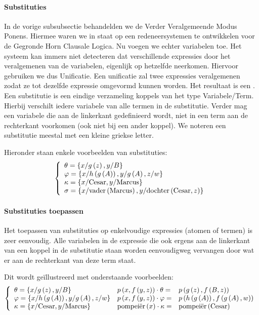 \paragraph{Substituties}
In de vorige subsubsectie behandelden we de Verder Veralgemeende Modus Ponens. Hiermee waren we in staat op een redeneersystemen te ontwikkelen voor de Gegronde Horn Clausale Logica. Nu voegen we echter variabelen toe. Het systeem kan immers niet detecteren dat verschillende expressies door het veralgemenen van de variabelen, eigenlijk op hetzelfde neerkomen. Hiervoor gebruiken we dus Unificatie. Een unificatie zal twee expressies veralgemenen zodat ze tot dezelfde expressie omgevormd kunnen worden. Het resultaat is een . Een substitutie is een eindige verzameling koppels van het type Variabele/Term. Hierbij verschilt iedere variabele van alle termen in de substitutie. Verder mag een variabele die aan de linkerkant gedefinieerd wordt, niet in een term aan de rechterkant voorkomen (ook niet bij een ander koppel). We noteren een substitutie meestal met een kleine griekse letter.
\begin{leftbar}
Hieronder staan enkele voorbeelden van substituties:
\begin{equation}
\left\{\begin{array}{l}
\theta=\left\{x/g\left(z\right),y/B\right\}\\
\varphi=\left\{x/h\left(g\left(A\right)\right),y/g\left(A\right),z/w\right\}\\
\kappa=\left\{x/\mbox{Cesar},y/\mbox{Marcus}\right\}\\
\sigma=\left\{x/\mbox{vader}\left( \mbox{Marcus} \right),y/\mbox{dochter}\left( \mbox{Cesar},z \right)\right\}
\end{array}\right.
\end{equation}
\end{leftbar}
\paragraph{Substituties toepassen}
Het toepassen van substituties op enkelvoudige expressies (atomen of termen) is zeer eenvoudig. Alle variabelen in de expressie die ook ergens aan de linkerkant van een koppel in de substitutie staan worden eenvoudigweg vervangen door wat er aan de rechterkant van deze term staat.
\begin{leftbar}
Dit wordt ge\"illustreerd met onderstaande voorbeelden:
\begin{equation}
\left\{\begin{array}{lll}
\theta=\left\{x/g\left(z\right),y/B\right\}&p\left(x,f\left(y,z\right)\right)\cdot\theta=&p\left(g\left(z\right),f\left(B,z\right)\right)\\
\varphi=\left\{x/h\left(g\left(A\right)\right),y/g\left(A\right),z/w\right\}&p\left(x,f\left(y,z\right)\right)\cdot\varphi=&p\left(h\left(g\left(A\right)\right),f\left(g\left(A\right),w\right)\right)\\
\kappa=\left\{x/\mbox{Cesar},y/\mbox{Marcus}\right\}&\mbox{pompei\"er}\left( x \right)\cdot\kappa=&\mbox{pompei\"er}\left( \mbox{Cesar} \right)\\
\end{array}\right.
\end{equation}
\end{leftbar}
